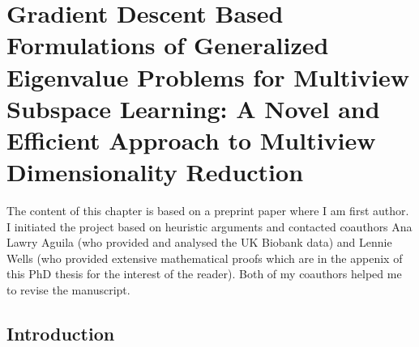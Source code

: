 \chapter{Gradient Descent Based Formulations of Generalized Eigenvalue Problems for Multiview Subspace Learning: A Novel and Efficient Approach to Multiview Dimensionality Reduction}\label{gradient descent}

The content of this chapter is based on a preprint paper where I am first author.
I initiated the project based on heuristic arguments and contacted coauthors Ana Lawry Aguila (who provided and analysed the UK Biobank data) and Lennie Wells (who provided extensive mathematical proofs which are in the appenix of this PhD thesis for the interest of the reader).
Both of my coauthors helped me to revise the manuscript.

\section{Introduction} %

